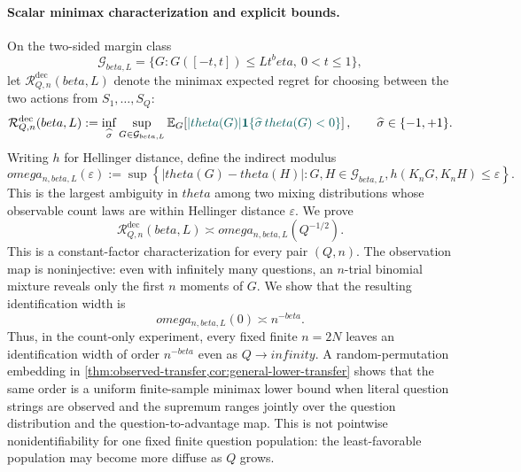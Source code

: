 \documentclass[11pt]{article}
\def\beta{beta}%
\def\theta{theta}%
\def\omega{omega}%
\def\infty{infinity}%
\newcommand{\E}{\mathbb E}
\newcommand{\one}{\mathbf 1}
\newcommand{\calG}{\mathcal G}
\newcommand{\calR}{\mathcal R}
\newcommand{\eps}{\varepsilon}
\newcommand\ced[1]{{\color{teal!70!black} #1}}
\begin{document}
\paragraph{Scalar minimax characterization and explicit bounds.}
On the two-sided margin class
\[
\calG_{\beta,L}
=
\{G:G([-t,t])\le Lt^\beta,\ 0<t\le1\},
\]
let $\calR^{\mathrm{dec}}_{Q,n}(\beta,L)$ denote the minimax expected regret for choosing between the two actions from $S_1,\ldots,S_Q$:
\[
\calR^{\mathrm{dec}}_{Q,n}(\beta,L)
:=
\inf_{\widehat\sigma}
\sup_{G\in\calG_{\beta,L}}
\E_G\!\left[
\ced{|\theta(G)|
\one\{\widehat\sigma\,\theta(G)<0\}}
\right],
\qquad \widehat\sigma\in\{-1,+1\}.
\]
Writing $h$ for Hellinger distance, define the indirect modulus
\[
\omega_{n,\beta,L}(\eps)
:=
\sup\left\{
|\theta(G)-\theta(H)|:
G,H\in\calG_{\beta,L},
h(K_nG,K_nH)\le\eps
\right\}.
\]
This is the largest ambiguity in $\theta$ among two mixing distributions whose observable count laws are within Hellinger distance $\eps$.  We prove %
\begin{equation}
\label{eq:intro-modulus}
\calR^{\mathrm{dec}}_{Q,n}(\beta,L)
\asymp
\omega_{n,\beta,L}(Q^{-1/2}).
\end{equation}
This is a constant-factor characterization for every pair $(Q,n)$.  The observation map is noninjective: even with infinitely many questions, an $n$-trial binomial mixture reveals only the first $n$ moments of $G$.  We show that the resulting identification width is
\begin{equation}
\label{eq:intro-floor}
\omega_{n,\beta,L}(0)
\asymp
n^{-\beta}.
\end{equation}
Thus, in the count-only experiment, every fixed finite $n=2N$ leaves an identification width of order $n^{-\beta}$ even as $Q\to\infty$.  A random-permutation embedding in \cref{thm:observed-transfer,cor:general-lower-transfer} shows that the same order is a uniform finite-sample minimax lower bound when literal question strings are observed and the supremum ranges jointly over the question distribution and the question-to-advantage map.  This is not pointwise nonidentifiability for one fixed finite question population: the least-favorable population may become more diffuse as $Q$ grows.
\end{document}
